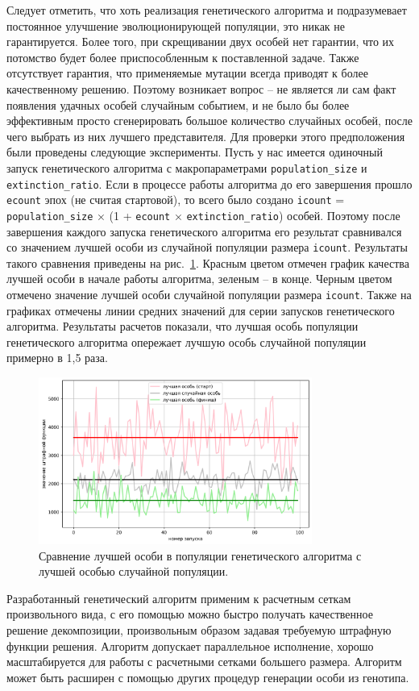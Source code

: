Следует отметить, что хоть реализация генетического алгоритма и подразумевает постоянное улучшение эволюционирующей популяции, это никак не гарантируется.
Более того, при скрещивании двух особей нет гарантии, что их потомство будет более приспособленным к поставленной задаче.
Также отсутствует гарантия, что применяемые мутации всегда приводят к более качественному решению.
Поэтому возникает вопрос -- не является ли сам факт появления удачных особей случайным событием, и не было бы более эффективным просто сгенерировать большое количество случайных особей, после чего выбрать из них лучшего представителя.
Для проверки этого предположения были проведены следующие эксперименты.
Пусть у нас имеется одиночный запуск генетического алгоритма с макропараметрами \texttt{population\_size} и \texttt{extinction\_ratio}.
Если в процессе работы алгоритма до его завершения прошло \texttt{ecount} эпох (не считая стартовой), то всего было создано \texttt{icount} = \texttt{population\_size} × (1 + \texttt{ecount} × \texttt{extinction\_ratio}) особей.
Поэтому после завершения каждого запуска генетического алгоритма его результат сравнивался со значением лучшей особи из случайной популяции размера \texttt{icount}.
Результаты такого сравнения приведены на рис.~\ref{fig:text_2_genetic_chart2}.
Красным цветом отмечен график качества лучшей особи в начале работы алгоритма, зеленым -- в конце.
Черным цветом отмечено значение лучшей особи случайной популяции размера \texttt{icount}.
Также на графиках отмечены линии средних значений для серии запусков генетического алгоритма.
Результаты расчетов показали, что лучшая особь популяции генетического алгоритма опережает лучшую особь случайной популяции примерно в 1,5 раза.

\begin{figure}[ht]
\centering
\includegraphics[width=0.8\textwidth]{./pics/text_2_genetic/chart2.png}
\caption{Сравнение лучшей особи в популяции генетического алгоритма с лучшей особью случайной популяции.}
\label{fig:text_2_genetic_chart2}
\end{figure}

Разработанный генетический алгоритм применим к расчетным сеткам произвольного вида, с его помощью можно быстро получать качественное решение декомпозиции, произвольным образом задавая требуемую штрафную функции решения.
Алгоритм допускает параллельное исполнение, хорошо масштабируется для работы с расчетными сетками большего размера.
Алгоритм может быть расширен с помощью других процедур генерации особи из генотипа.
